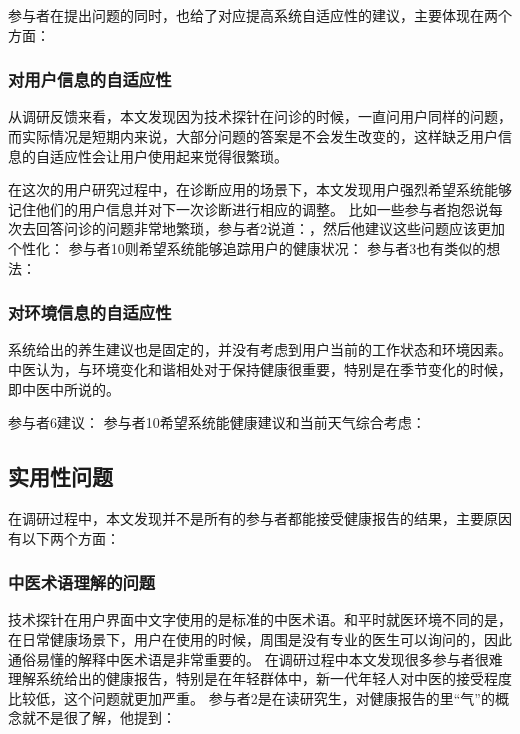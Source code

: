 参与者在提出问题的同时，也给了对应提高系统自适应性的建议，主要体现在两个方面：

\subsubsection{对用户信息的自适应性}

从调研反馈来看，本文发现因为技术探针在问诊的时候，一直问用户同样的问题，而实际情况是短期内来说，大部分问题的答案是不会发生改变的，这样缺乏用户信息的自适应性会让用户使用起来觉得很繁琐。

在这次的用户研究过程中，在诊断应用的场景下，本文发现用户强烈希望系统能够记住他们的用户信息并对下一次诊断进行相应的调整。
比如一些参与者抱怨说每次去回答问诊的问题非常地繁琐，参与者2说道：，然后他建议这些问题应该更加个性化：
参与者10则希望系统能够追踪用户的健康状况：
参与者3也有类似的想法：

\subsubsection{对环境信息的自适应性}

系统给出的养生建议也是固定的，并没有考虑到用户当前的工作状态和环境因素。中医认为，与环境变化和谐相处对于保持健康很重要，特别是在季节变化的时候，即中医中所说的。

参与者6建议：
参与者10希望系统能健康建议和当前天气综合考虑：


\subsection{实用性问题}
在调研过程中，本文发现并不是所有的参与者都能接受健康报告的结果，主要原因有以下两个方面：

\subsubsection{中医术语理解的问题}

技术探针在用户界面中文字使用的是标准的中医术语。和平时就医环境不同的是，在日常健康场景下，用户在使用的时候，周围是没有专业的医生可以询问的，因此通俗易懂的解释中医术语是非常重要的。
在调研过程中本文发现很多参与者很难理解系统给出的健康报告，特别是在年轻群体中，新一代年轻人对中医的接受程度比较低，这个问题就更加严重。
参与者2是在读研究生，对健康报告的里“气”的概念就不是很了解，他提到：

